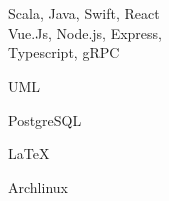 \documentclass[11pt]{spidercv}
\begin{document}
\begin{SideBar}{\ColorBackground}{\ColorTextSide}


  \\
  \vspace{0.2cm}
  \\
  \vspace{0.2cm}

  \vspace{0.5cm}

  \begin{ItemList}{\ColorHighlight}
    \item [\large\faCode] Scala, Java, Swift, React\\Vue.Js, Node.js, Express,\\ Typescript, gRPC
    \item [\large\faCubes] UML
    \item [\large\faDatabase] PostgreSQL
    \item [\large\faPencilSquareO] \LaTeX
    \item [\large\faLinux] Archlinux
  \end{ItemList}





\end{SideBar}
\end{document}
